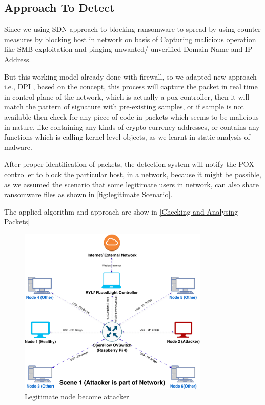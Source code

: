 \documentclass[12pt,letterpaper]{article}
\begin{document}
    \subsection{Approach To Detect}

        Since we using SDN approach to blocking ransomware to spread by using counter measures by blocking host in network on basis of Capturing malicious operation like SMB exploitation and pinging unwanted/ unverified Domain Name and IP Address.

        But this working model already done with firewall, so we adapted new approach i.e., \ac{DPI} \cite{enwiki:1223318045}, based on the concept, this process will capture the packet in real time in control plane of the network, which is actually a pox controller, then it will match the pattern of signature with pre-existing samples, or if sample is not available then check for any piece of code in packets which seems to be malicious in nature, like containing any kinds of crypto-currency addresses, or contains any functions which is calling kernel level objects, as we learnt in static analysis of malware.

        After proper identification of packets, the detection system will notify the POX controller to block the particular host, in a network, because it might be possible, as we assumed the scenario that some legitimate users in network, can also share ransomware files as shown in \autoref{fig:legitimate Scenario}.

        The applied algorithm and approach are show in \autoref{Checking and Analysing Packets}

        \begin{figure}[ht]
            \centering
            \includegraphics[height = 8cm]{images/Scene1.pdf}
            \caption{Legitimate node become attacker}
            \label{fig:legitimate Scenario}
        \end{figure}
\end{document}

